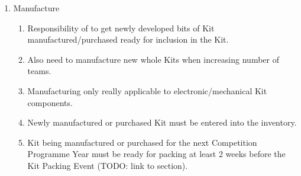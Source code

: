 \begin{draft}
\begin{enumerate}
\item Manufacture
  \begin{enumerate}
    \item Responsibility of  to get newly developed bits of Kit manufactured/purchased ready for inclusion in the Kit.
    \item Also need to manufacture new whole Kits when increasing number of teams.
    \item Manufacturing only really applicable to electronic/mechanical Kit components.
    \item Newly manufactured or purchased Kit must be entered into the inventory.
    \item Kit being manufactured or purchased for the next Competition Programme Year must be ready for packing at least 2 weeks before the Kit Packing Event (TODO: link to section).
  \end{enumerate}


\end{enumerate}
\end{draft}
